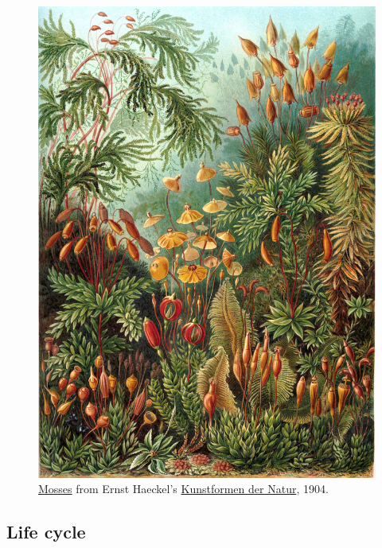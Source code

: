 \begin{figure}

{\centering \includegraphics[width=0.7\linewidth]{./figures/mosses/Haeckel_Muscinae}

}

\caption{\href{https://commons.wikimedia.org/wiki/File:Haeckel_Muscinae.jpg}{Mosses}
from Ernst Haeckel's
\href{https://en.wikipedia.org/wiki/Kunstformen_der_Natur}{Kunstformen
der Natur}, 1904.}\label{fig:mosses}
\end{figure}

\subsection{Life cycle}\label{life-cycle}

